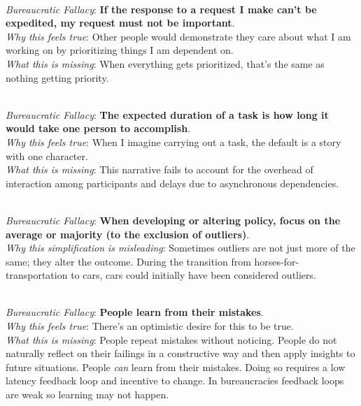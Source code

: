 \ \\
\textit{Bureaucratic Fallacy}: \textbf{If the response to a request I make can't be expedited, my request must not be important}.  \\
\textit{Why this feels true}: Other people would demonstrate they care about what I am working on by prioritizing things I am dependent on.\\
\textit{What this is missing}: When everything gets prioritized, that's the same as nothing getting priority.

\ \\
\textit{Bureaucratic Fallacy}: \textbf{The expected duration of a task is how long it would take one person to accomplish}.  \\
\textit{Why this feels true}: When I imagine carrying out a task, the default is a story with one character. \\
\textit{What this is missing}: This narrative fails to account for the overhead of interaction among participants and delays due to asynchronous dependencies. \cite{1975_brooks}


\ \\
\textit{Bureaucratic Fallacy}: \textbf{When developing or altering policy, focus on the average or majority (to the exclusion of outliers)}. \\
\textit{Why this simplification is misleading}: Sometimes outliers are not just more of the same; they alter the outcome. During the transition from horses-for-transportation to cars, cars could initially have been considered outliers. 

\ \\
\textit{Bureaucratic Fallacy}: \textbf{People learn from their mistakes}. \\
\textit{Why this feels true}: There's an optimistic desire for this to be true. \\
\textit{What this is missing}: 
People repeat mistakes without noticing. People do not naturally reflect on their failings in a constructive way and then apply insights to future situations.
People \textit{can} learn from their mistakes. Doing so requires a low latency feedback loop and incentive to change. In bureaucracies feedback loops are weak so learning may not happen.

